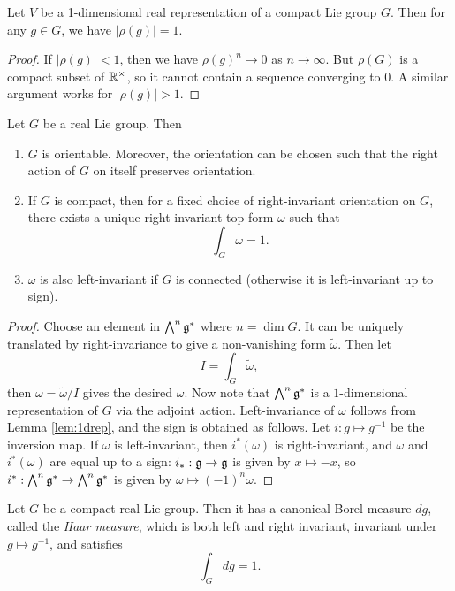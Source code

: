 \begin{lemma}\label{lem:1drep}
  Let $V$ be a 1-dimensional real
  representation of a compact Lie group $G$.
  Then for any $g \in G$, we have
  $|\rho(g)| = 1$.
\end{lemma}

\begin{proof}
  If $|\rho(g)| < 1$, then we have
  $\rho(g)^n \to 0$ as $n \to \infty$.
  But $\rho(G)$ is a compact subset of
  $\mathbb{R}^\times$, so it cannot contain
  a sequence converging to
  $0$. A similar argument works for
  $|\rho(g)| > 1$.
\end{proof}

\begin{theorem}
  Let $G$ be a real Lie group. Then
  \begin{enumerate}
    \item $G$ is orientable. Moreover,
      the orientation can be chosen such
      that the right action of $G$ on
      itself preserves orientation.
    \item If $G$ is compact, then
      for a fixed choice of right-invariant
      orientation on $G$, there exists
      a unique right-invariant top
      form $\omega$ such that
      \[
        \int_G \omega = 1.
      \]
    \item $\omega$ is also left-invariant
      if $G$ is connected (otherwise it is
      left-invariant up to sign).
  \end{enumerate}
\end{theorem}

\begin{proof}
  Choose an element in $\bigwedge^n \mathfrak{g}^*$
  where $n = \dim G$. It can be uniquely
  translated by right-invariance to
  give a non-vanishing form $\widetilde{\omega}$.
  Then let
  \[
    I = \int_G \widetilde{\omega},
  \]
  then $\omega = \widetilde{\omega} / I$
  gives the desired $\omega$. Now
  note that $\bigwedge^n \mathfrak{g}^*$ is
  a $1$-dimensional representation of
  $G$ via the adjoint action.
  Left-invariance of $\omega$ follows
  from Lemma \ref{lem:1drep}, and the
  sign is obtained as follows.
  Let $i : g \mapsto g^{-1}$ be the
  inversion map. If $\omega$ is
  left-invariant, then $i^*(\omega)$ is
  right-invariant, and
  $\omega$ and $i^*(\omega)$ are equal
  up to a sign: $i_* : \mathfrak{g} \to \mathfrak{g}$ is given
  by $x \mapsto -x$, so
  $i^* : \bigwedge^n \mathfrak{g}^* \to \bigwedge^n \mathfrak{g}^*$
  is given by $\omega \mapsto (-1)^n \omega$.
\end{proof}

\begin{theorem}
  Let $G$ be a compact real Lie group. Then
  it has a canonical Borel measure $dg$,
  called the \emph{Haar measure},
  which is both left and right invariant,
  invariant under $g \mapsto g^{-1}$, and
  satisfies
  \[
    \int_G dg = 1.
  \]
\end{theorem}

